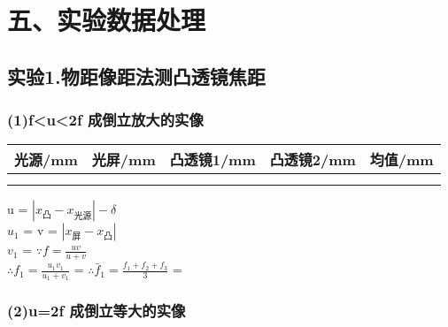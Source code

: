 \documentclass[11pt,a4paper,oneside]{article}
\begin{document}
\section*{五、实验数据处理}
\subsection*{实验1.物距像距法测凸透镜焦距}
\subsubsection*{(1)f<u<2f 成倒立放大的实像}

\begin{center}

\begin{tabular}{|c|c|c|c|c|}
\hline 
光源/mm & 光屏/mm & 凸透镜1/mm & 凸透镜2/mm & 均值/mm \\ 
\hline 
{%
{%
{%
{%
& %
{%
{%
\\
\hline
{%
\end{tabular}
\vspace{10pt}

\end{center}
u = $\left | {x}_{\text{凸}} - {x}_{\text{光源}} \right | - {\delta}$\\
${u}_1$ = %
v = $\left | {x}_{\text{屏}} - {x}_{\text{凸}} \right |$\\
${v}_1$ = %
$\because f = \frac{uv}{u+v}$\\
$\therefore {f}_1 = \frac{{u}_1{v}_1}{{u}_1+{v}_1}$ = %
$\therefore {\bar{f}}_1 = \frac{{f}_1+{f}_2+{f}_3}{3}$ = %

\subsubsection*{(2)u=2f 成倒立等大的实像}
\end{document}
